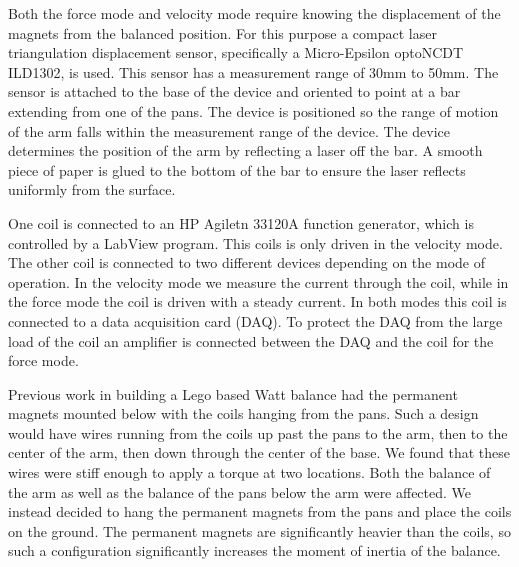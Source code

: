 \documentclass[aps,prstab,reprint,12pt]{revtex4-1}
\begin{document}
Both the force mode and velocity mode require knowing the displacement of the magnets from the balanced position. For this purpose a compact laser triangulation displacement sensor, specifically a Micro-Epsilon optoNCDT ILD1302, is used. This sensor has a measurement range of 30mm to 50mm. 
The sensor is attached to the base of the device and oriented to point at a bar extending from one of the pans. The device is positioned so the range of motion of the arm falls within the measurement range of the device. The device determines the position of the arm by reflecting a laser off the bar. A smooth piece of paper is glued to the bottom of the bar to ensure the laser reflects uniformly from the surface.

One coil is connected to an HP Agiletn 33120A function generator, which is controlled by a LabView program. This coils is only driven in the velocity mode. The other coil is connected to two different devices depending on the mode of operation. In the velocity mode we measure the current through the coil, while in the force mode the coil is driven with a steady current. In both modes this coil is connected to a data acquisition card (DAQ).
To protect the DAQ from the large load of the coil an amplifier is connected between the DAQ and the coil for the force mode.

Previous work in building a Lego based Watt balance \cite{Chao2015} had the permanent magnets mounted below with the coils hanging from the pans. Such a design would have wires running from the coils up past the pans to the arm, then to the center of the arm, then down through the center of the base. We found that these wires were stiff enough to apply a torque at two locations. Both the balance of the arm as well as the balance of the pans below the arm were affected. We instead decided to hang the permanent magnets from the pans and place the coils on the ground. The permanent magnets are significantly heavier than the coils, so such a configuration significantly increases the moment of inertia of the balance. 
\end{document}
